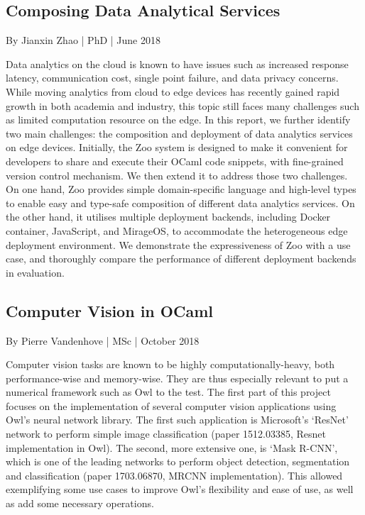 \hypertarget{Composing Data Analytical Services}{%
\subsection{Composing Data Analytical Services}\label{theses-zoo}}

By Jianxin Zhao | PhD | June 2018

Data analytics on the cloud is known to have issues such as increased response latency, communication cost, single point failure, and data privacy concerns. While moving analytics from cloud to edge devices has recently gained rapid growth in both academia and industry, this topic still faces many challenges such as limited computation resource on the edge. In this report, we further identify two main challenges: the composition and deployment of data analytics services on edge devices. Initially, the Zoo system is designed to make it convenient for developers to share and execute their OCaml code snippets, with fine-grained version control mechanism. We then extend it to address those two challenges. On one hand, Zoo provides simple domain-specific language and high-level types to enable easy and type-safe composition of different data analytics services. On the other hand, it utilises multiple deployment backends, including Docker container, JavaScript, and MirageOS, to accommodate the heterogeneous edge deployment environment. We demonstrate the expressiveness of Zoo with a use case, and thoroughly compare the performance of different deployment backends in evaluation.


\hypertarget{Computer Vision in OCaml}{%
\subsection{Computer Vision in OCaml}\label{theses-vision}}

By Pierre Vandenhove | MSc | October 2018

Computer vision tasks are known to be highly computationally-heavy, both performance-wise and memory-wise. They are thus especially relevant to put a numerical framework such as Owl to the test. The first part of this project focuses on the implementation of several computer vision applications using Owl's neural network library. The first such application is Microsoft's ‘ResNet' network to perform simple image classification (paper 1512.03385, Resnet implementation in Owl). The second, more extensive one, is ‘Mask R-CNN', which is one of the leading networks to perform object detection, segmentation and classification (paper 1703.06870, MRCNN implementation). This allowed exemplifying some use cases to improve Owl's flexibility and ease of use, as well as add some necessary operations.

